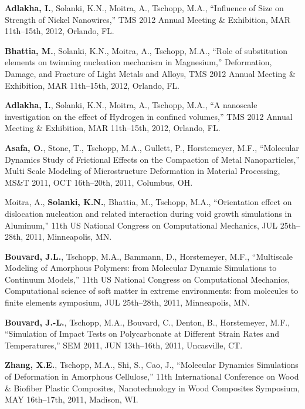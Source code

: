 \begin{cvlist}
\item
\textbf{Adlakha, I.}, Solanki, K.N., Moitra, A., Tschopp, M.A., ``Influence of Size on Strength of Nickel Nanowires,'' TMS 2012 Annual Meeting \& Exhibition, MAR 11th--15th, 2012, Orlando, FL.

\item
\textbf{Bhattia, M.}, Solanki, K.N., Moitra, A., Tschopp, M.A., ``Role of substitution elements on twinning nucleation mechanism in Magnesium,'' Deformation, Damage, and Fracture of Light Metals and Alloys, TMS 2012 Annual Meeting \& Exhibition, MAR 11th--15th, 2012, Orlando, FL.

\item
\textbf{Adlakha, I.}, Solanki, K.N., Moitra, A., Tschopp, M.A., ``A nanoscale investigation on the effect of Hydrogen in confined volumes,'' TMS 2012 Annual Meeting \& Exhibition, MAR 11th--15th, 2012, Orlando, FL.

\item
\textbf{Asafa, O.}, Stone, T., Tschopp, M.A., Gullett, P., Horstemeyer, M.F., ``Molecular Dynamics Study of Frictional Effects on the Compaction of Metal Nanoparticles,'' Multi Scale Modeling of Microstructure Deformation in Material Processing, MS\&T 2011, OCT 16th--20th, 2011, Columbus, OH.

\item
Moitra, A., \textbf{Solanki, K.N.}, Bhattia, M., Tschopp, M.A., ``Orientation effect on dislocation nucleation and related interaction during void growth simulations in Aluminum,'' 11th US National Congress on Computational Mechanics, JUL 25th--28th, 2011, Minneapolis, MN.

\item
\textbf{Bouvard, J.L.}, Tschopp, M.A., Bammann, D., Horstemeyer, M.F., ``Multiscale Modeling of Amorphous Polymers: from Molecular Dynamic Simulations to Continuum Models,'' 11th US National Congress on Computational Mechanics, Computational science of soft matter in extreme environments: from molecules to finite elements symposium, JUL 25th--28th, 2011, Minneapolis, MN.

\item 
\textbf{Bouvard, J.-L.}, {Tschopp, M.A.}, Bouvard, C., Denton, B., Horstemeyer, M.F., ``Simulation of Impact Tests on Polycarbonate at Different Strain Rates and Temperatures,'' SEM 2011, JUN 13th--16th, 2011, Uncasville, CT.

\item
\textbf{Zhang, X.E.}, Tschopp, M.A., Shi, S., Cao, J., ``Molecular Dynamics Simulations of Deformation in Amorphous Cellulose,'' 11th International Conference on Wood \& Biofiber Plastic Composites, Nanotechnology in Wood Composites Symposium, MAY 16th--17th, 2011, Madison, WI.


\end{cvlist}
